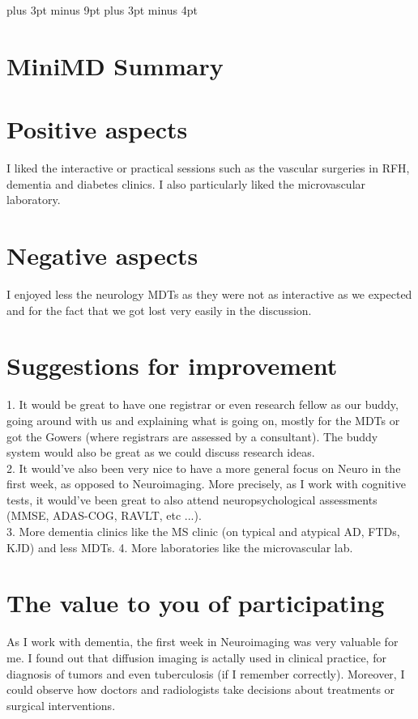 \documentclass[12pt,a4paper,oneside]{report}
\begin{document}
\belowdisplayskip=12pt plus 3pt minus 9pt
\belowdisplayshortskip=7pt plus 3pt minus 4pt


\section*{MiniMD Summary}


\section*{Positive aspects} 

I liked the interactive or practical sessions such as the vascular surgeries in RFH, dementia and diabetes clinics. I also particularly liked the microvascular laboratory. 

\section*{Negative aspects}

I enjoyed less the neurology MDTs as they were not as interactive as we expected and for the fact that we got lost very easily in the discussion. 

\section*{Suggestions for improvement}

1. It would be great to have one registrar or even research fellow as our buddy, going around with us and explaining what is going on, mostly for the MDTs or got the Gowers (where registrars are assessed by a consultant). The buddy system would also be great as we could discuss research ideas.  \\
2. It would've also been very nice to have a more general focus on Neuro in the first week, as opposed to Neuroimaging. More precisely, as I work with cognitive tests, it would've been great to also attend neuropsychological assessments (MMSE, ADAS-COG, RAVLT, etc ...). \\
3. More dementia clinics like the MS clinic (on typical and atypical AD, FTDs, KJD) and less MDTs.
4. More laboratories like the microvascular lab.

\section*{The value to you of participating}

As I work with dementia, the first week in Neuroimaging was very valuable for me. I found out that diffusion imaging is actally used in clinical practice, for diagnosis of tumors and even tuberculosis (if I remember correctly). Moreover, I could observe how doctors and radiologists take decisions about treatments or surgical interventions. 
\end{document}
